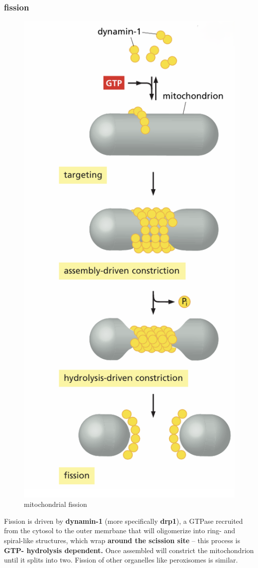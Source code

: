 \documentclass[../main.tex]{subfiles}
\begin{document}
\subsubsection{fission}
\begin{figure}[H]
    \centering
    \includegraphics[width=0.4\linewidth]{fission.png}
    \caption{mitochondrial fission}
    \label{fig:enter-label}
\end{figure}
Fission is driven by \textbf{\gls{dynamin-1}} (more specifically \textbf{\gls{drp1}}), a GTPase recruited from the cytosol to the outer memrbane that will  oligomerize into ring- and spiral-like structures, which wrap \textbf{around 
the scission site} – this process is \textbf{GTP- hydrolysis dependent.} Once assembled will constrict the mitochondrion until it splits into two. Fission of other organelles like peroxisomes is similar. 
\end{document}
